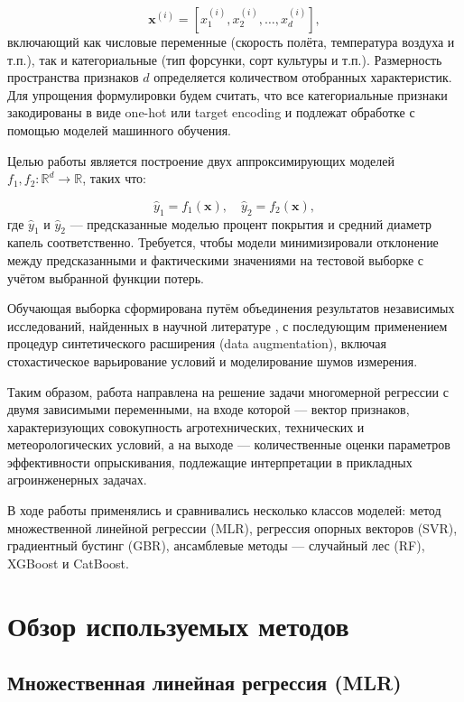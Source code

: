 \begin{equation}
\mathbf{x}^{(i)} = \left[ x_1^{(i)}, x_2^{(i)}, \ldots, x_d^{(i)} \right],
\end{equation}
включающий как числовые переменные (скорость полёта, температура воздуха и т.п.), так и категориальные (тип форсунки, сорт культуры и т.п.). Размерность пространства признаков $d$ определяется количеством отобранных характеристик. Для упрощения формулировки будем считать, что все категориальные признаки закодированы в виде one-hot или target encoding и подлежат обработке с помощью моделей машинного обучения.

Целью работы является построение двух аппроксимирующих моделей $f_1, f_2: \mathbb{R}^d \to \mathbb{R}$, таких что:

\begin{equation}
	\hat{y}_1 = f_1(\mathbf{x}), \quad \hat{y}_2 = f_2(\mathbf{x}),
\end{equation}
где $\hat{y}_1$ и $\hat{y}_2$ --- предсказанные моделью процент покрытия и средний диаметр капель соответственно. Требуется, чтобы модели минимизировали отклонение между предсказанными и фактическими значениями на тестовой выборке с учётом выбранной функции потерь. 

Обучающая выборка сформирована путём объединения результатов независимых  исследований, найденных в научной литературе \cite{UAVOP, FlightMode}, с последующим применением процедур синтетического расширения (data augmentation), включая стохастическое варьирование условий и моделирование шумов измерения.

Таким образом, работа направлена на решение задачи многомерной регрессии с двумя зависимыми переменными, на входе которой --- вектор признаков, характеризующих совокупность агротехнических, технических и метеорологических условий, а на выходе --- количественные оценки параметров эффективности опрыскивания, подлежащие интерпретации в прикладных агроинженерных задачах.

В ходе работы применялись и сравнивались несколько классов моделей: метод множественной линейной регрессии (MLR), регрессия опорных векторов (SVR), градиентный бустинг (GBR), ансамблевые методы --- случайный лес (RF), XGBoost и CatBoost.

\section{Обзор используемых методов} \label{ch1:methods}
\subsection{Множественная линейная регрессия (MLR)}
